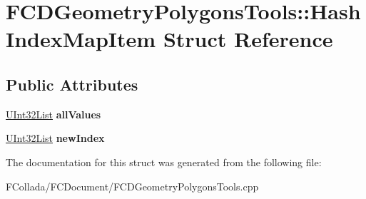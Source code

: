 \hypertarget{structFCDGeometryPolygonsTools_1_1HashIndexMapItem}{
\section{FCDGeometryPolygonsTools::HashIndexMapItem Struct Reference}
\label{structFCDGeometryPolygonsTools_1_1HashIndexMapItem}
}
\subsection*{Public Attributes}
\begin{DoxyCompactItemize}
\item 
\hypertarget{structFCDGeometryPolygonsTools_1_1HashIndexMapItem_af22db3852e28e0136ce0d1f40b87e4d3}{
\hyperlink{classfm_1_1vector}{UInt32List} {\bfseries allValues}}
\label{structFCDGeometryPolygonsTools_1_1HashIndexMapItem_af22db3852e28e0136ce0d1f40b87e4d3}

\item 
\hypertarget{structFCDGeometryPolygonsTools_1_1HashIndexMapItem_a30732466b6713125c0e96372c1a826a1}{
\hyperlink{classfm_1_1vector}{UInt32List} {\bfseries newIndex}}
\label{structFCDGeometryPolygonsTools_1_1HashIndexMapItem_a30732466b6713125c0e96372c1a826a1}

\end{DoxyCompactItemize}


The documentation for this struct was generated from the following file:\begin{DoxyCompactItemize}
\item 
FCollada/FCDocument/FCDGeometryPolygonsTools.cpp\end{DoxyCompactItemize}
